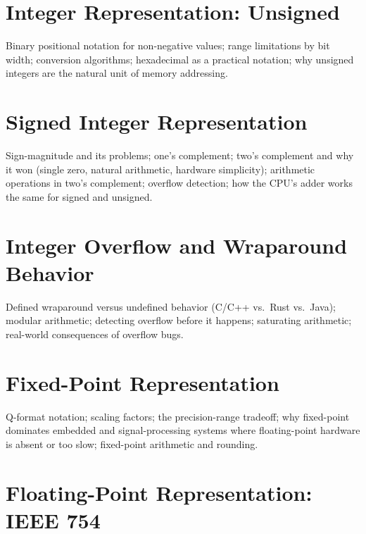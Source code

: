 \chapter{Integer Representation: Unsigned}
\label{ch:unsigned-integers}

Binary positional notation for non-negative values; range limitations by
bit width; conversion algorithms; hexadecimal as a practical notation;
why unsigned integers are the natural unit of memory addressing.

\chapter{Signed Integer Representation}
\label{ch:signed-integers}

Sign-magnitude and its problems; one's complement; two's complement and why
it won (single zero, natural arithmetic, hardware simplicity); arithmetic
operations in two's complement; overflow detection; how the CPU's adder works
the same for signed and unsigned.

\chapter{Integer Overflow and Wraparound Behavior}
\label{ch:integer-overflow}

Defined wraparound versus undefined behavior (C/C++ vs.\ Rust vs.\ Java);
modular arithmetic; detecting overflow before it happens; saturating
arithmetic; real-world consequences of overflow bugs.

\chapter{Fixed-Point Representation}
\label{ch:fixed-point}

Q-format notation; scaling factors; the precision-range tradeoff; why
fixed-point dominates embedded and signal-processing systems where
floating-point hardware is absent or too slow; fixed-point arithmetic
and rounding.


%

\chapter{Floating-Point Representation: IEEE 754}
\label{ch:ieee754}

